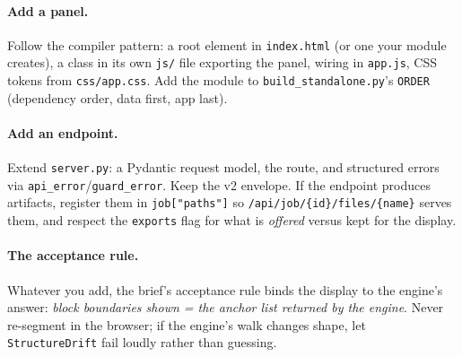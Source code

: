 \documentclass[11pt,a4paper]{article}
\begin{document}
\paragraph{Add a panel.} Follow the compiler pattern: a root element in
\texttt{index.html} (or one your module creates), a class in its own
\texttt{js/} file exporting the panel, wiring in \texttt{app.js}, CSS
tokens from \texttt{css/app.css}. Add the module to
\texttt{build\_standalone.py}'s \texttt{ORDER} (dependency order, data
first, app last).

\paragraph{Add an endpoint.} Extend \texttt{server.py}: a Pydantic
request model, the route, and structured errors via
\texttt{api\_error}/\texttt{guard\_error}. Keep the v2 envelope. If the
endpoint produces artifacts, register them in \texttt{job["paths"]} so
\texttt{/api/job/\{id\}/files/\{name\}} serves them, and respect the
\texttt{exports} flag for what is \emph{offered} versus kept for the
display.

\paragraph{The acceptance rule.} Whatever you add, the brief's
acceptance rule binds the display to the engine's answer:
\emph{block boundaries shown = the anchor list returned by the engine}.
Never re-segment in the browser; if the engine's walk changes shape, let
\texttt{StructureDrift} fail loudly rather than guessing.
\end{document}
